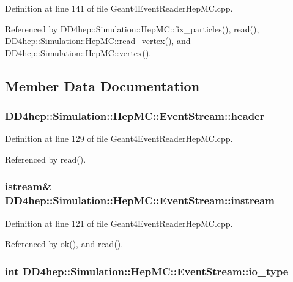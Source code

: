 Definition at line 141 of file Geant4EventReaderHepMC.cpp.

Referenced by DD4hep::Simulation::HepMC::fix\_\-particles(), read(), DD4hep::Simulation::HepMC::read\_\-vertex(), and DD4hep::Simulation::HepMC::vertex().

\subsection{Member Data Documentation}
\hypertarget{class_d_d4hep_1_1_simulation_1_1_hep_m_c_1_1_event_stream_ac60c5b73780a0d523e2042a93610dfe3}{
\subsubsection[{header}]{ {\bf DD4hep::Simulation::HepMC::EventStream::header}}}
\label{class_d_d4hep_1_1_simulation_1_1_hep_m_c_1_1_event_stream_ac60c5b73780a0d523e2042a93610dfe3}


Definition at line 129 of file Geant4EventReaderHepMC.cpp.

Referenced by read().\hypertarget{class_d_d4hep_1_1_simulation_1_1_hep_m_c_1_1_event_stream_a2702d64e41d9b280f84ebbae47521125}{
\subsubsection[{instream}]{\setlength{\rightskip}{0pt plus 5cm}istream\& {\bf DD4hep::Simulation::HepMC::EventStream::instream}}}
\label{class_d_d4hep_1_1_simulation_1_1_hep_m_c_1_1_event_stream_a2702d64e41d9b280f84ebbae47521125}


Definition at line 121 of file Geant4EventReaderHepMC.cpp.

Referenced by ok(), and read().\hypertarget{class_d_d4hep_1_1_simulation_1_1_hep_m_c_1_1_event_stream_ab72b33619d738dd59539035f4e02792f}{
\subsubsection[{io\_\-type}]{\setlength{\rightskip}{0pt plus 5cm}int {\bf DD4hep::Simulation::HepMC::EventStream::io\_\-type}}}
\label{class_d_d4hep_1_1_simulation_1_1_hep_m_c_1_1_event_stream_ab72b33619d738dd59539035f4e02792f}


